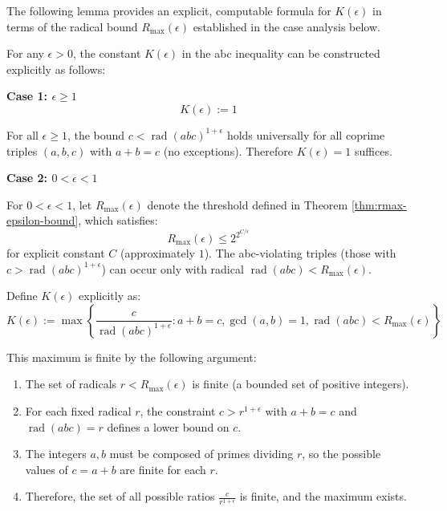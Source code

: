 The following lemma provides an explicit, computable formula for $K(\epsilon)$ in terms of the radical bound $R_{\max}(\epsilon)$ established in the case analysis below.

\begin{lemma}
\label{lem:explicit-k-epsilon-construction}

For any $\epsilon > 0$, the constant $K(\epsilon)$ in the abc inequality can be constructed explicitly as follows:

\noindent \textbf{Case 1: $\epsilon \geq 1$}
\begin{equation}
K(\epsilon) := 1
\end{equation}

For all $\epsilon \geq 1$, the bound $c < \operatorname{rad}(abc)^{1+\epsilon}$ holds universally for all coprime triples $(a,b,c)$ with $a+b=c$ (no exceptions). Therefore $K(\epsilon) = 1$ suffices.

\noindent \textbf{Case 2: $0 < \epsilon < 1$}

For $0 < \epsilon < 1$, let $R_{\max}(\epsilon)$ denote the threshold defined in Theorem \ref{thm:rmax-epsilon-bound}, which satisfies:
\begin{equation}
R_{\max}(\epsilon) \leq 2^{2^{C/\epsilon}}
\end{equation}
for explicit constant $C$ (approximately $1$). The abc-violating triples (those with $c > \operatorname{rad}(abc)^{1+\epsilon}$) can occur only with radical $\operatorname{rad}(abc) < R_{\max}(\epsilon)$.

Define $K(\epsilon)$ explicitly as:
\begin{equation}
\label{eq:k-epsilon-formula}
K(\epsilon) := \max \left\{ \frac{c}{\operatorname{rad}(abc)^{1+\epsilon}} : a+b=c, \gcd(a,b)=1, \operatorname{rad}(abc) < R_{\max}(\epsilon) \right\}
\end{equation}

This maximum is finite by the following argument:
\begin{enumerate}
\item The set of radicals $r < R_{\max}(\epsilon)$ is finite (a bounded set of positive integers).
\item For each fixed radical $r$, the constraint $c > r^{1+\epsilon}$ with $a+b=c$ and $\operatorname{rad}(abc) = r$ defines a lower bound on $c$.
\item The integers $a, b$ must be composed of primes dividing $r$, so the possible values of $c = a + b$ are finite for each $r$.
\item Therefore, the set of all possible ratios $\frac{c}{r^{1+\epsilon}}$ is finite, and the maximum exists.
\end{enumerate}


\end{lemma}
